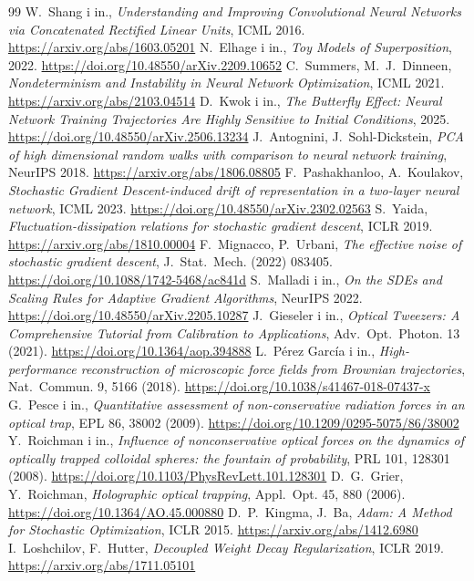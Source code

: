 \documentclass[a4paper,11pt]{article}
\begin{document}
\begin{thebibliography}{99}
 W.~Shang i in., \emph{Understanding and Improving Convolutional Neural Networks via Concatenated Rectified Linear Units}, ICML 2016. \url{https://arxiv.org/abs/1603.05201}
 N.~Elhage i in., \emph{Toy Models of Superposition}, 2022. \url{https://doi.org/10.48550/arXiv.2209.10652}
 C.~Summers, M.~J.~Dinneen, \emph{Nondeterminism and Instability in Neural Network Optimization}, ICML 2021. \url{https://arxiv.org/abs/2103.04514}
 D.~Kwok i in., \emph{The Butterfly Effect: Neural Network Training Trajectories Are Highly Sensitive to Initial Conditions}, 2025. \url{https://doi.org/10.48550/arXiv.2506.13234}
 J.~Antognini, J.~Sohl-Dickstein, \emph{PCA of high dimensional random walks with comparison to neural network training}, NeurIPS 2018. \url{https://arxiv.org/abs/1806.08805}
 F.~Pashakhanloo, A.~Koulakov, \emph{Stochastic Gradient Descent-induced drift of representation in a two-layer neural network}, ICML 2023. \url{https://doi.org/10.48550/arXiv.2302.02563}
 S.~Yaida, \emph{Fluctuation-dissipation relations for stochastic gradient descent}, ICLR 2019. \url{https://arxiv.org/abs/1810.00004}
 F.~Mignacco, P.~Urbani, \emph{The effective noise of stochastic gradient descent}, J.~Stat.~Mech. (2022) 083405. \url{https://doi.org/10.1088/1742-5468/ac841d}
 S.~Malladi i in., \emph{On the SDEs and Scaling Rules for Adaptive Gradient Algorithms}, NeurIPS 2022. \url{https://doi.org/10.48550/arXiv.2205.10287}
 J.~Gieseler i in., \emph{Optical Tweezers: A Comprehensive Tutorial from Calibration to Applications}, Adv.~Opt.~Photon. 13 (2021). \url{https://doi.org/10.1364/aop.394888}
 L.~Pérez García i in., \emph{High-performance reconstruction of microscopic force fields from Brownian trajectories}, Nat.~Commun. 9, 5166 (2018). \url{https://doi.org/10.1038/s41467-018-07437-x}
 G.~Pesce i in., \emph{Quantitative assessment of non-conservative radiation forces in an optical trap}, EPL 86, 38002 (2009). \url{https://doi.org/10.1209/0295-5075/86/38002}
 Y.~Roichman i in., \emph{Influence of nonconservative optical forces on the dynamics of optically trapped colloidal spheres: the fountain of probability}, PRL 101, 128301 (2008). \url{https://doi.org/10.1103/PhysRevLett.101.128301}
 D.~G.~Grier, Y.~Roichman, \emph{Holographic optical trapping}, Appl.~Opt. 45, 880 (2006). \url{https://doi.org/10.1364/AO.45.000880}
 D.~P.~Kingma, J.~Ba, \emph{Adam: A Method for Stochastic Optimization}, ICLR 2015. \url{https://arxiv.org/abs/1412.6980}
 I.~Loshchilov, F.~Hutter, \emph{Decoupled Weight Decay Regularization}, ICLR 2019. \url{https://arxiv.org/abs/1711.05101}
\end{thebibliography}
\end{document}
